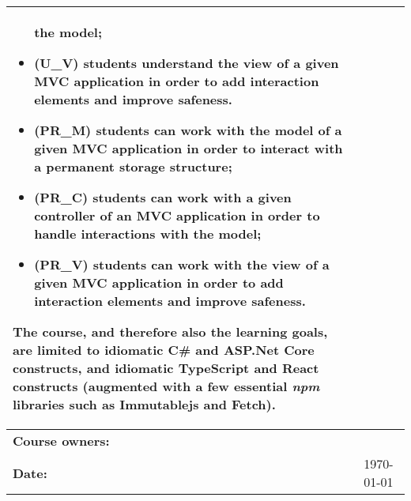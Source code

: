 \begin{tabularx}{\textwidth}{|>{\columncolor{lichtGrijs}} p{}|X|}
\begin{itemize}
the model; 
					\item (U\_V) students understand the view of a given MVC application in order to add interaction elements and improve safeness.
					\item (PR\_M) students can work with the model of a given MVC application in order to interact with a permanent storage structure; 
					\item  (PR\_C) students can work with a given controller of an MVC application in order to handle interactions with
the model; 
					\item (PR\_V) students can work with the view of a given MVC application in order to add interaction elements and improve safeness.
\end{itemize}

The course, and therefore also the learning goals, are limited to
idiomatic C\# and ASP.Net Core constructs, and idiomatic TypeScript and
React constructs (augmented with a few essential \emph{npm} libraries
such as Immutablejs and Fetch).\\
	\hline

	\textbf{Course owners:} & \author\\
	\hline
	\textbf{Date:} & \today \\
	\hline
\end{tabularx}
\newpage
